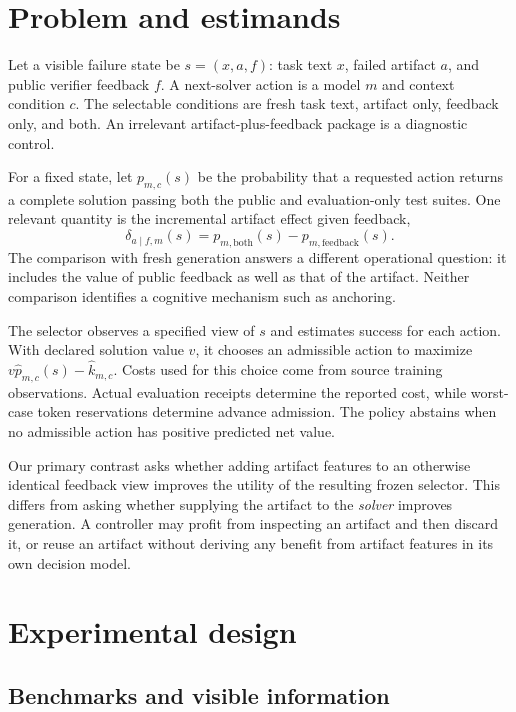 \documentclass[10pt,twocolumn]{article}
\begin{document}
\section{Problem and estimands}

Let a visible failure state be $s=(x,a,f)$: task text $x$, failed artifact $a$,
and public verifier feedback $f$. A next-solver action is a model $m$ and context
condition $c$. The selectable conditions are fresh task text, artifact only,
feedback only, and both. An irrelevant artifact-plus-feedback package is a
diagnostic control.

For a fixed state, let $p_{m,c}(s)$ be the probability that a requested action
returns a complete solution passing both the public and evaluation-only test suites. One relevant
quantity is the incremental artifact effect given feedback,
\[
  \delta_{a\mid f,m}(s)
    =p_{m,\mathrm{both}}(s)-p_{m,\mathrm{feedback}}(s).
\]
The comparison with fresh generation answers a different operational question:
it includes the value of public feedback as well as that of the artifact.
Neither comparison identifies a cognitive mechanism such as anchoring.

The selector observes a specified view of $s$ and estimates success for each
action. With declared solution value $v$, it chooses an admissible action to
maximize $v\widehat p_{m,c}(s)-\widehat k_{m,c}$. Costs used for this choice come
from source training observations. Actual evaluation receipts determine the
reported cost, while worst-case token reservations determine advance admission.
The policy abstains when no admissible action has positive predicted net value.

Our primary contrast asks whether adding artifact features to an otherwise
identical feedback view improves the utility of the resulting frozen selector.
This differs from asking whether supplying the artifact to the \emph{solver}
improves generation. A controller may profit from inspecting an artifact and
then discard it, or reuse an artifact without deriving any benefit from artifact
features in its own decision model.

\section{Experimental design}

\subsection{Benchmarks and visible information}
\end{document}

